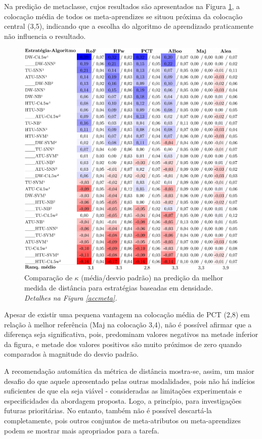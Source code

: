 Na predição de metaclasse, cujos resultados são apresentados na Figura \ref{dist}, a colocação média de todos os meta-aprendizes se situou próxima da colocação central (3,5), indicando que a escolha do algoritmo de aprendizado praticamente não influencia o resultado.
\begin{figure}
\centering
\includegraphics[scale=0.215]{images/metadist.pdf}
\caption[Comparação de $\kappa$ na predição da melhor medida de distância.]{Comparação de $\kappa$ (média/desvio padrão) na predição da melhor medida de distância para estratégias baseadas em densidade.
\textit{Detalhes na Figura \ref{accmeta}.}}
\label{dist}
\end{figure}

Apesar de existir uma pequena vantagem na colocação média de PCT (2,8) em relação à melhor referência (Maj na colocação 3,4), não é possível afirmar que a diferença seja significativa, pois, predominam valores negativos na metade inferior da figura, e metade dos valores positivos são muito próximos de zero quando comparados à magnitude do desvio padrão.

A recomendação automática da métrica de distância mostra-se, assim, um maior desafio do que aquele apresentado pelas outras modalidades, pois não há indícios suficientes de que ela seja viável - consideradas as limitações experimentais e especificidades da abordagem proposta.
Logo, a princípio,
 para investigações futuras prioritárias.
No entanto, também não é possível descartá-la completamente, pois outros conjuntos de meta-atributos ou meta-aprendizes podem se mostrar mais apropriados para a tarefa.

